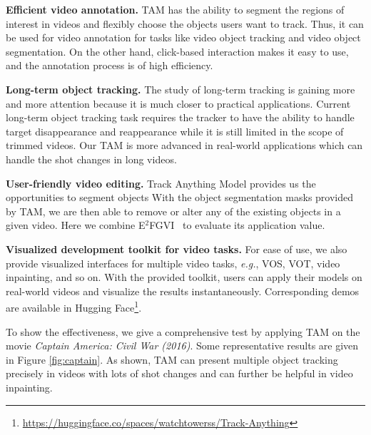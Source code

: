 \documentclass{article}
\begin{document}
\textbf{Efficient video annotation.}
TAM has the ability to segment the regions of interest in videos and flexibly choose the objects users want to track. Thus, it can be used for video annotation for tasks like video object tracking and video object segmentation.
On the other hand, click-based interaction makes it easy to use, and the annotation process is of high efficiency.


\textbf{Long-term object tracking.}
The study of long-term tracking is gaining more and more attention because it is much closer to practical applications.
Current long-term object tracking task requires the tracker to have the ability to handle target disappearance and reappearance while it is still limited in the scope of trimmed videos.
Our TAM is more advanced in real-world applications which can handle the shot changes in long videos.


\textbf{User-friendly video editing.}
Track Anything Model provides us the opportunities to segment objects
With the object segmentation masks provided by TAM, we are then able to remove or alter any of the existing objects in a given video.
Here we combine E$^2$FGVI~\cite{e2fgvi} to evaluate its application value.

\textbf{Visualized development toolkit for video tasks.}
For ease of use, we also provide visualized interfaces for multiple video tasks, \textit{e.g.}, VOS, VOT, video inpainting, and so on.
With the provided toolkit, users can apply their models on real-world videos and visualize the results instantaneously.
Corresponding demos are available in Hugging Face\footnote{\url{https://huggingface.co/spaces/watchtowerss/Track-Anything}}.


To show the effectiveness, we give a comprehensive test by applying TAM on the movie \textit{Captain America: Civil War (2016)}.
Some representative results are given in Figure \ref{fig:captain}.
As shown, TAM can present multiple object tracking precisely in videos with lots of shot changes and can further be helpful in video inpainting.












\end{document}
